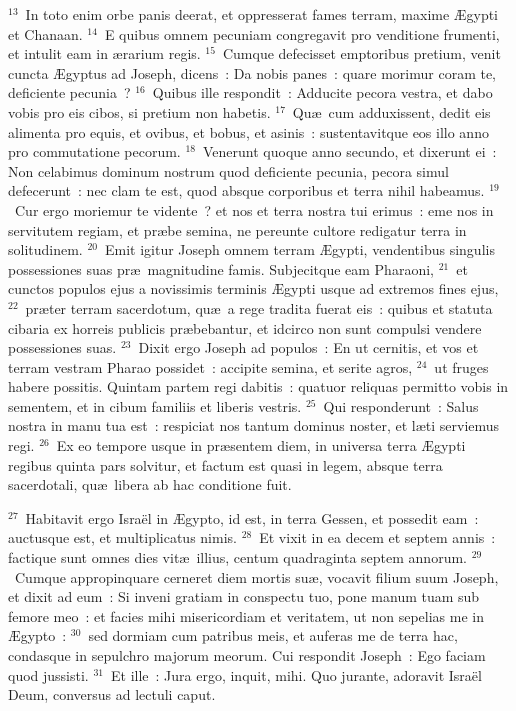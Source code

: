 ${}^{13}$~In toto enim orbe panis deerat, et oppresserat fames terram, maxime \AE gypti et Chanaan.
${}^{14}$~E quibus omnem pecuniam congregavit pro venditione frumenti, et intulit eam in \ae rarium regis.
${}^{15}$~Cumque defecisset emptoribus pretium, venit cuncta \AE gyptus ad Joseph, dicens~: Da nobis panes~: quare morimur coram te, deficiente pecunia~?
${}^{16}$~Quibus ille respondit~: Adducite pecora vestra, et dabo vobis pro eis cibos, si pretium non habetis.
${}^{17}$~Qu\ae\ cum adduxissent, dedit eis alimenta pro equis, et ovibus, et bobus, et asinis~: sustentavitque eos illo anno pro commutatione pecorum.
${}^{18}$~Venerunt quoque anno secundo, et dixerunt ei~: Non celabimus dominum nostrum quod deficiente pecunia, pecora simul defecerunt~: nec clam te est, quod absque corporibus et terra nihil habeamus.
${}^{19}$~Cur ergo moriemur te vidente~? et nos et terra nostra tui erimus~: eme nos in servitutem regiam, et pr\ae be semina, ne pereunte cultore redigatur terra in solitudinem.
${}^{20}$~Emit igitur Joseph omnem terram \AE gypti, vendentibus singulis possessiones suas pr\ae\ magnitudine famis. Subjecitque eam Pharaoni,
${}^{21}$~et cunctos populos ejus a novissimis terminis \AE gypti usque ad extremos fines ejus,
${}^{22}$~pr\ae ter terram sacerdotum, qu\ae\ a rege tradita fuerat eis~: quibus et statuta cibaria ex horreis publicis pr\ae bebantur, et idcirco non sunt compulsi vendere possessiones suas.
${}^{23}$~Dixit ergo Joseph ad populos~: En ut cernitis, et vos et terram vestram Pharao possidet~: accipite semina, et serite agros,
${}^{24}$~ut fruges habere possitis. Quintam partem regi dabitis~: quatuor reliquas permitto vobis in sementem, et in cibum familiis et liberis vestris.
${}^{25}$~Qui responderunt~: Salus nostra in manu tua est~: respiciat nos tantum dominus noster, et l\ae ti serviemus regi.
${}^{26}$~Ex eo tempore usque in pr\ae sentem diem, in universa terra \AE gypti regibus quinta pars solvitur, et factum est quasi in legem, absque terra sacerdotali, qu\ae\ libera ab hac conditione fuit.


${}^{27}$~Habitavit ergo Isra\"el in \AE gypto, id est, in terra Gessen, et possedit eam~: auctusque est, et multiplicatus nimis.
${}^{28}$~Et vixit in ea decem et septem annis~: factique sunt omnes dies vit\ae\ illius, centum quadraginta septem annorum.
${}^{29}$~Cumque appropinquare cerneret diem mortis su\ae , vocavit filium suum Joseph, et dixit ad eum~: Si inveni gratiam in conspectu tuo, pone manum tuam sub femore meo~: et facies mihi misericordiam et veritatem, ut non sepelias me in \AE gypto~:
${}^{30}$~sed dormiam cum patribus meis, et auferas me de terra hac, condasque in sepulchro majorum meorum. Cui respondit Joseph~: Ego faciam quod jussisti.
${}^{31}$~Et ille~: Jura ergo, inquit, mihi. Quo jurante, adoravit Isra\"el Deum, conversus ad lectuli caput.

